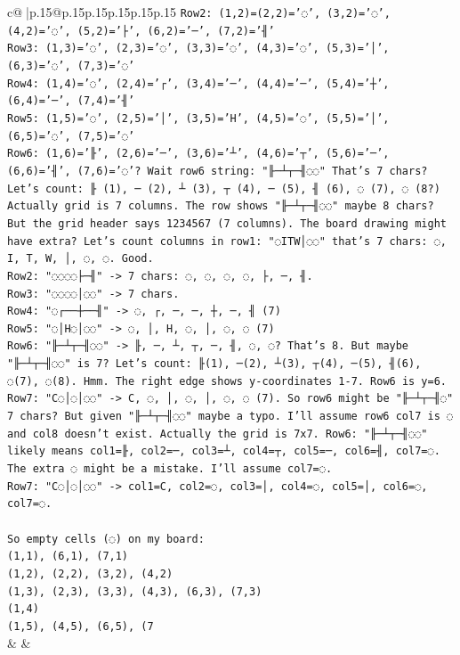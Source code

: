 \documentclass{article}
\begin{document}
{\begin{supertabular}{c@{$\;$}|p{.15\linewidth}@{}p{.15\linewidth}p{.15\linewidth}p{.15\linewidth}p{.15\linewidth}p{.15\linewidth}}
{{{\texttt{Row2: (1,2)=(2,2)='◌', (3,2)='◌', (4,2)='◌', (5,2)='├', (6,2)='─', (7,2)='╢'} \\
\texttt{Row3: (1,3)='◌', (2,3)='◌', (3,3)='◌', (4,3)='◌', (5,3)='│', (6,3)='◌', (7,3)='◌'} \\
\texttt{Row4: (1,4)='◌', (2,4)='┌', (3,4)='─', (4,4)='─', (5,4)='┼', (6,4)='─', (7,4)='╢'} \\
\texttt{Row5: (1,5)='◌', (2,5)='│', (3,5)='H', (4,5)='◌', (5,5)='│', (6,5)='◌', (7,5)='◌'} \\
\texttt{Row6: (1,6)='╟', (2,6)='─', (3,6)='┴', (4,6)='┬', (5,6)='─', (6,6)='╢', (7,6)='◌'? Wait row6 string: "╟─┴┬─╢◌◌" That's 7 chars? Let's count: ╟ (1), ─ (2), ┴ (3), ┬ (4), ─ (5), ╢ (6), ◌ (7), ◌ (8?) Actually grid is 7 columns. The row shows "╟─┴┬─╢◌◌" maybe 8 chars? But the grid header says 1234567 (7 columns). The board drawing might have extra? Let's count columns in row1: "◌ITW│◌◌" that's 7 chars: ◌, I, T, W, │, ◌, ◌. Good.} \\
\texttt{Row2: "◌◌◌◌├─╢" {-}> 7 chars: ◌, ◌, ◌, ◌, ├, ─, ╢.} \\
\texttt{Row3: "◌◌◌◌│◌◌" {-}> 7 chars.} \\
\texttt{Row4: "◌┌──┼──╢" {-}> ◌, ┌, ─, ─, ┼, ─, ╢ (7)} \\
\texttt{Row5: "◌│H◌│◌◌" {-}> ◌, │, H, ◌, │, ◌, ◌ (7)} \\
\texttt{Row6: "╟─┴┬─╢◌◌" {-}> ╟, ─, ┴, ┬, ─, ╢, ◌, ◌? That's 8. But maybe "╟─┴┬─╢◌◌" is 7? Let's count: ╟(1), ─(2), ┴(3), ┬(4), ─(5), ╢(6), ◌(7), ◌(8). Hmm. The right edge shows y{-}coordinates 1{-}7. Row6 is y=6. Row7: "C◌│◌│◌◌" {-}> C, ◌, │, ◌, │, ◌, ◌ (7). So row6 might be "╟─┴┬─╢◌" 7 chars? But given "╟─┴┬─╢◌◌" maybe a typo. I'll assume row6 col7 is ◌ and col8 doesn't exist. Actually the grid is 7x7. Row6: "╟─┴┬─╢◌◌" likely means col1=╟, col2=─, col3=┴, col4=┬, col5=─, col6=╢, col7=◌. The extra ◌ might be a mistake. I'll assume col7=◌.} \\
\texttt{Row7: "C◌│◌│◌◌" {-}> col1=C, col2=◌, col3=│, col4=◌, col5=│, col6=◌, col7=◌.} \\
\\ 
\texttt{So empty cells (◌) on my board:} \\
\texttt{(1,1), (6,1), (7,1)} \\
\texttt{(1,2), (2,2), (3,2), (4,2)} \\
\texttt{(1,3), (2,3), (3,3), (4,3), (6,3), (7,3)} \\
\texttt{(1,4)} \\
\texttt{(1,5), (4,5), (6,5), (7} \\
            }
        }
    }
    & & \\ \\


\end{supertabular}}
\end{document}
